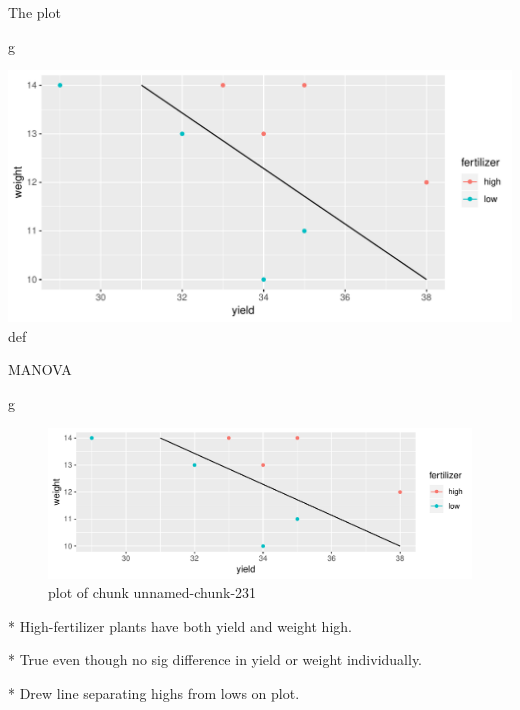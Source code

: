 \documentclass[ignorenonframetext,]{beamer}
\newenvironment{Shaded}{\begin{snugshade}}{\end{snugshade}}
\newcommand{\NormalTok}[1]{#1}
\begin{document}
\begin{frame}[fragile]{The plot}
\protect\hypertarget{the-plot-7}{}

\begin{Shaded}
\begin{Highlighting}[]
\NormalTok{g}
\end{Highlighting}
\end{Shaded}

\includegraphics{figure/charlecombe-1.pdf} def

\end{frame}

\begin{frame}[fragile]{MANOVA}
\protect\hypertarget{manova}{}

\begin{Shaded}
\begin{Highlighting}[]
\NormalTok{g}
\end{Highlighting}
\end{Shaded}

\begin{figure}
\centering
\includegraphics{figure/unnamed-chunk-231-1.pdf}
\caption{plot of chunk unnamed-chunk-231}
\end{figure}

\begin{small}


* High-fertilizer plants have both yield and weight high.

* True even though no sig difference in yield or weight individually.

* Drew line separating highs from lows on plot.

\end{small}

\end{frame}
\end{document}
